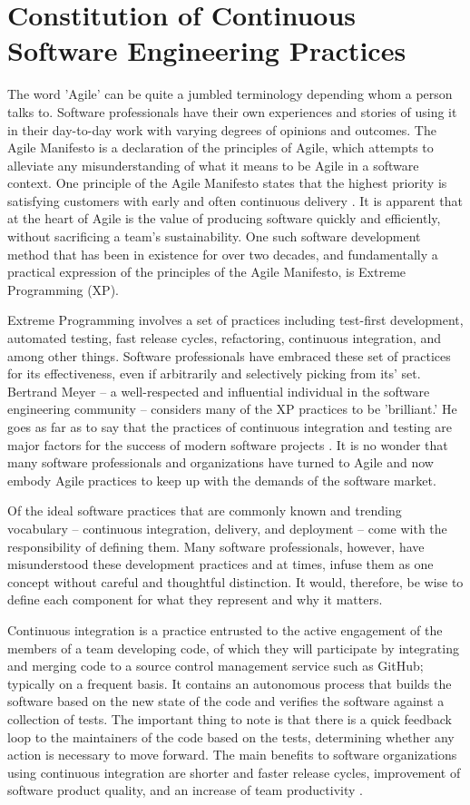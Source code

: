 \documentclass[12pt,a4paper]{article}
\begin{document}
\section{Constitution of Continuous Software Engineering Practices}
The word 'Agile' can be quite a jumbled terminology depending whom a person talks to. Software professionals have their own experiences and stories of using it in their day-to-day work with varying degrees of opinions and outcomes. The Agile Manifesto is a declaration of the principles of Agile, which attempts to alleviate any misunderstanding of what it means to be Agile in a software context. One principle of the Agile Manifesto states that the highest priority is satisfying customers with early and often continuous delivery \cite[p. ~50]{meyer_2014}. It is apparent that at the heart of Agile is the value of producing software quickly and efficiently, without sacrificing a team's sustainability. One such software development method that has been in existence for over two decades, and fundamentally a practical expression of the principles of the Agile Manifesto, is Extreme Programming (XP). 

Extreme Programming involves a set of practices including test-first development, automated testing, fast release cycles, refactoring, continuous integration, and among other things. Software professionals have embraced these set of practices for its effectiveness, even if arbitrarily and selectively picking from its' set. Bertrand Meyer -- a well-respected and influential individual in the software engineering community -- considers many of the XP practices to be 'brilliant.' He goes as far as to say that the practices of continuous integration and testing are major factors for the success of modern software projects \cite[p. ~154]{meyer_2014}. It is no wonder that many software professionals and organizations have turned to Agile and now embody Agile practices to keep up with the demands of the software market.

Of the ideal software practices that are commonly known and trending vocabulary -- continuous integration, delivery, and deployment -- come with the responsibility of defining them. Many software professionals, however, have misunderstood these development practices and at times, infuse them as one concept without careful and thoughtful distinction. It would, therefore, be wise to define each component for what they represent and why it matters.

Continuous integration is a practice entrusted to the active engagement of the members of a team developing code, of which they will participate by integrating and merging code to a source control management service such as GitHub; typically on a frequent basis. It contains an autonomous process that builds the software based on the new state of the code and verifies the software against a collection of tests. The important thing to note is that there is a quick feedback loop to the maintainers of the code based on the tests, determining whether any action is necessary to move forward. The main benefits to software organizations using continuous integration are shorter and faster release cycles, improvement of software product quality, and an increase of team productivity \cite[p. ~3910]{shahin_babar_zhu_2017}.
\end{document}
